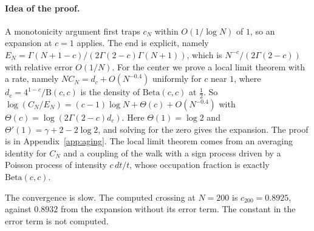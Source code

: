 \paragraph{Idea of the proof.}
A monotonicity argument first traps $c_N$ within $O(1/\log N)$ of $1$, so an expansion at $c=1$
applies. The end is explicit, namely
$E_N=\Gamma(N+1-c)/(2\Gamma(2-c)\Gamma(N+1))$, which is
$N^{-c}/(2\Gamma(2-c))$ with relative error $O(1/N)$. For the center we prove
a local limit theorem with a rate, namely $NC_N=d_c+O(N^{-0.4})$ uniformly
for $c$ near $1$, where $d_c=4^{1-c}/\mathrm B(c,c)$ is the density of
$\mathrm{Beta}(c,c)$ at $\frac12$. So
$\log(C_N/E_N)=(c-1)\log N+\Theta(c)+O(N^{-0.4})$ with
$\Theta(c)=\log(2\Gamma(2-c)d_c)$. Here $\Theta(1)=\log2$ and
$\Theta'(1)=\gamma+2-2\log2$, and solving for the zero gives the expansion.
The proof is in Appendix~\ref{app:aging}. The local limit theorem comes from
an averaging identity for $C_N$ and a coupling of the walk with a sign
process driven by a Poisson process of intensity $c\,dt/t$, whose occupation
fraction is exactly $\mathrm{Beta}(c,c)$.

The convergence is slow. The computed crossing at $N=200$ is $c_{200}=0.8925$,
against $0.8932$ from the expansion without its error term. The constant in
the error term is not computed.
